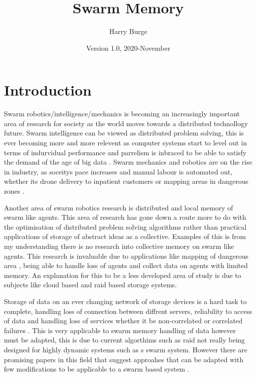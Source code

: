 \documentclass{UoYCSproject}
\author{Harry Burge}
\title{Swarm Memory}
\date{Version 1.0, 2020-November}
\begin{document}
\maketitle
\listoffigures
\listoftables



\begin{summary}

\end{summary}


\chapter{Introduction}
\label{cha:Introduction}

Swarm robotics/intelligence/mechanics is becoming an increasingly important area of research for society as the world moves towards a distributed technollogy future.
Swarm intelligence can be viewed as distributed problem solving\cite{Cognitive maps mine detection, Swarm intellegiegence}, this is ever becoming more and more relevent as computer systems start to level out in terms of indurvidual performance  \cite{CPU speed} and parrelism is inbraced to be able to satisfy the demand of the age of big data \cite{Avalability storage}. 
Swarm mechanics and robotics are on the rise in industry, as soceitys pace increases and manual labour is automated out, whether its drone delivery to inpatient customers or mapping areas in dangerous zones \cite{Swarm robotics reviewed}.

Another area of swarm robotics research is distributed and local memory of swarm like agents. This area of research has gone down a route more to do with the optimisation of distributed problem solving algorithms rather than practical applications of storage of abstract ideas as a collective. Examples of this is from my understanding there is no research into collective memory on swarm like agents. This research is invaluable due to applications like mapping of dangerous area \cite{Cognitive maps mine detection}, being able to handle loss of agents and collect data on agents with limited memory. An explanation for this to be a less developed area of study is due to subjects like cloud based and raid based storage systems.

Storage of data on an ever changing network of storage devices is a hard task to complete, handling loss of connection between diffrent servers, reliability to access of data and handling loss of services whether it be non-correlated or correlated failures \cite{Avalability storage}. This is very applicable to swarm memory handling of data however must be adapted, this is due to current algorthims such as raid not really being designed for highly dynamic systems such as s swarm system. However there are promising papers in this field that suggest approahes that can be adapted with few modifications to be applicable to a swarm based system \cite{Distributed Storage}. 
\end{document}
